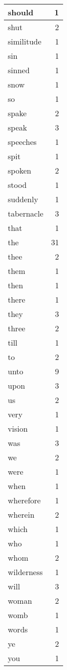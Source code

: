 \begin{center}
\begin{longtable}{l|r}
should & 1 \\ \hline
shut & 2 \\ \hline
similitude & 1 \\ \hline
sin & 1 \\ \hline
sinned & 1 \\ \hline
snow & 1 \\ \hline
so & 1 \\ \hline
spake & 2 \\ \hline
speak & 3 \\ \hline
speeches & 1 \\ \hline
spit & 1 \\ \hline
spoken & 2 \\ \hline
stood & 1 \\ \hline
suddenly & 1 \\ \hline
tabernacle & 3 \\ \hline
that & 1 \\ \hline
the & 31 \\ \hline
thee & 2 \\ \hline
them & 1 \\ \hline
then & 1 \\ \hline
there & 1 \\ \hline
they & 3 \\ \hline
three & 2 \\ \hline
till & 1 \\ \hline
to & 2 \\ \hline
unto & 9 \\ \hline
upon & 3 \\ \hline
us & 2 \\ \hline
very & 1 \\ \hline
vision & 1 \\ \hline
was & 3 \\ \hline
we & 2 \\ \hline
were & 1 \\ \hline
when & 1 \\ \hline
wherefore & 1 \\ \hline
wherein & 2 \\ \hline
which & 1 \\ \hline
who & 1 \\ \hline
whom & 2 \\ \hline
wilderness & 1 \\ \hline
will & 3 \\ \hline
woman & 2 \\ \hline
womb & 1 \\ \hline
words & 1 \\ \hline
ye & 2 \\ \hline
you & 1 \\ \hline
\end{longtable}
\end{center}



